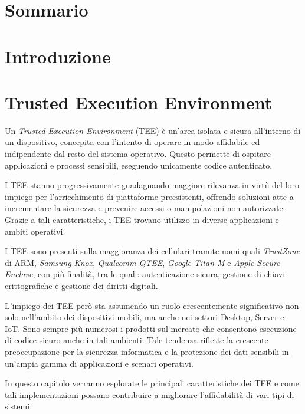 \documentclass[12pt,italian]{report}
\begin{document}
	\frontespizio
	\afterpreface

	\chapter*{Sommario}
	\label{cap:sommario}
	
	\chapter{Introduzione}
	\label{sec:introduzione}
	
	\chapter{Trusted Execution Environment}
	\label{cap:TEE}
	Un \textit{Trusted Execution Environment} (TEE) è un'area isolata e sicura all'interno di un dispositivo, concepita con l'intento di operare in modo affidabile ed indipendente dal resto del sistema operativo. Questo permette di ospitare applicazioni e processi sensibili, eseguendo unicamente codice autenticato.
	
	I TEE stanno progressivamente guadagnando maggiore rilevanza in virtù del loro impiego per l'arricchimento di piattaforme preesistenti, offrendo soluzioni atte a incrementare la sicurezza e prevenire accessi o manipolazioni non autorizzate. Grazie a tali caratteristiche, i TEE trovano utilizzo in diverse applicazioni e ambiti operativi.
	
	\bigbreak
	
	I TEE sono presenti sulla maggioranza dei cellulari tramite nomi quali \textit{TrustZone} di ARM, \textit{Samsung Knox}, \textit{Qualcomm QTEE}, \textit{Google Titan M} e \textit{Apple Secure Enclave}, con più finalità, tra le quali: autenticazione sicura, gestione di chiavi crittografiche e gestione dei diritti digitali.
	
	L'impiego dei TEE però sta assumendo un ruolo crescentemente significativo non solo nell'ambito dei dispositivi mobili, ma anche nei settori Desktop, Server e IoT. Sono sempre più numerosi i prodotti sul mercato che consentono esecuzione di codice sicuro anche in tali ambienti. Tale tendenza riflette la crescente preoccupazione per la sicurezza informatica e la protezione dei dati sensibili in un'ampia gamma di applicazioni e scenari operativi.
	
	In questo capitolo verranno esplorate le principali caratteristiche dei TEE e come tali implementazioni possano contribuire a migliorare l'affidabilità di vari tipi di sistemi.
	
\end{document}
